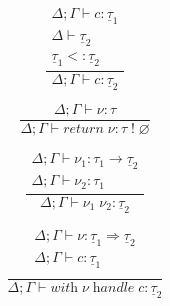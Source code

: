 \documentclass[12pt]{article}
\newcommand\ty[0]{\tau}
\newcommand\tarr[2]{#1 \rightarrow #2}
\newcommand\thandler[2]{#1 \Rightarrow #2}
\newcommand\cty[0]{\underline{\ty}}
\newcommand\aty[2]{#1 \; ! \; #2}
\newcommand\val[0]{\nu}
\newcommand\comp[0]{c}
\newcommand\creturn[1]{\textit{return} \; #1}
\newcommand\capp[2]{#1 \; #2}
\newcommand\chandle[2]{\textit{with} \; #1 \; \textit{handle} \; #2}
\newcommand\subty[2]{#1 <: #2}
\begin{document}
\begin{minipage}{0.5\textwidth}
\[\frac{
	\begin{array}{l}
	\Delta;\Gamma \vdash \comp : \cty_1 \\
	\Delta \vdash \cty_2 \\
	\subty{\cty_1}{\cty_2}
	\end{array}
}{
	\Delta;\Gamma \vdash \comp : \cty_2
}\]
\vspace{10pt}
\end{minipage}
\begin{minipage}{0.5\textwidth}
\[\frac{
	\Delta;\Gamma \vdash \val : \ty
}{
	\Delta;\Gamma \vdash \creturn{\val} : \aty{\ty}{\varnothing}
}\]
\vspace{10pt}
\end{minipage}
\begin{minipage}{0.5\textwidth}
\[\frac{
	\begin{array}{l}
	\Delta;\Gamma \vdash \val_1 : \tarr{\ty_1}{\cty_2} \\
	\Delta;\Gamma \vdash \val_2 : \ty_1
	\end{array}
}{
	\Delta;\Gamma \vdash \capp{\val_1}{\val_2} : \cty_2
}\]
\vspace{10pt}
\end{minipage}
\begin{minipage}{0.5\textwidth}
\[\frac{
	\begin{array}{l}
	\Delta;\Gamma \vdash \val : \thandler{\cty_1}{\cty_2} \\
	\Delta;\Gamma \vdash \comp : \cty_1 \\
	\end{array}
}{
	\Delta;\Gamma \vdash \chandle{\val}{\comp} : \cty_2
}\]
\vspace{10pt}
\end{minipage}
\\
\end{document}
